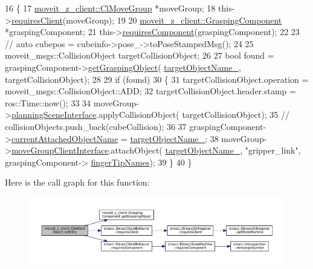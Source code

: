 \begin{DoxyCode}
16     \{
17         \hyperlink{classmoveit__z__client_1_1ClMoveGroup}{moveit\_z\_client::ClMoveGroup} *moveGroup;
18         this->\hyperlink{classsmacc_1_1SmaccClientBehavior_a917f001e763a1059af337bf4e164f542}{requiresClient}(moveGroup);
19 
20         \hyperlink{classmoveit__z__client_1_1GraspingComponent}{moveit\_z\_client::GraspingComponent} *graspingComponent;
21         this->\hyperlink{classsmacc_1_1SmaccClientBehavior_adee6abe3a28aa6b47d3dd5267e264b4d}{requiresComponent}(graspingComponent);
22 
23         \textcolor{comment}{// auto cubepos = cubeinfo->pose\_->toPoseStampedMsg();}
24 
25         moveit\_msgs::CollisionObject targetCollisionObject;
26 
27         \textcolor{keywordtype}{bool} found = graspingComponent->\hyperlink{classmoveit__z__client_1_1GraspingComponent_a791e7cd29d7dcbb85012ea1c5827db22}{getGraspingObject}(
      \hyperlink{classmoveit__z__client_1_1CbAttachObject_ad088ec4515832f106bd87606987d51d2}{targetObjectName\_}, targetCollisionObject);
28 
29         \textcolor{keywordflow}{if} (found)
30         \{
31             targetCollisionObject.operation = moveit\_msgs::CollisionObject::ADD;
32             targetCollisionObject.header.stamp = ros::Time::now();
33 
34             moveGroup->\hyperlink{classmoveit__z__client_1_1ClMoveGroup_a21c879b2683286aa21ce68f40195b4b5}{planningSceneInterface}.applyCollisionObject(
      targetCollisionObject);
35             \textcolor{comment}{// collisionObjects.push\_back(cubeCollision);}
36 
37             graspingComponent->\hyperlink{classmoveit__z__client_1_1GraspingComponent_a963ed612bc569ee45401e38133b802eb}{currentAttachedObjectName} = 
      \hyperlink{classmoveit__z__client_1_1CbAttachObject_ad088ec4515832f106bd87606987d51d2}{targetObjectName\_};
38             moveGroup->\hyperlink{classmoveit__z__client_1_1ClMoveGroup_af86e046b837be0ef4afa9893d8808f20}{moveGroupClientInterface}.attachObject(
      \hyperlink{classmoveit__z__client_1_1CbAttachObject_ad088ec4515832f106bd87606987d51d2}{targetObjectName\_}, \textcolor{stringliteral}{"gripper\_link"}, graspingComponent->
      \hyperlink{classmoveit__z__client_1_1GraspingComponent_a1a3da6af2dcf6e815042c5d892875412}{fingerTipNames});
39         \}
40     \}
\end{DoxyCode}
Here is the call graph for this function\+:
\nopagebreak
\begin{figure}[H]
\begin{center}
\leavevmode
\includegraphics[width=350pt]{classmoveit__z__client_1_1CbAttachObject_ad6b02ebdaf8b6d93f3d00bc901e33bcd_cgraph}
\end{center}
\end{figure}
